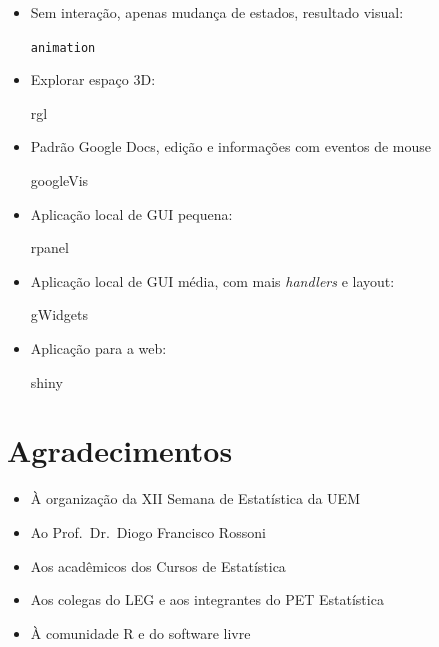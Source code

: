 \begin{frame}

  \begin{multicols}{2}
    \begin{itemize}
      \pause \item Sem interação, apenas mudança de estados, resultado
      visual: \pause
      \begin{center}
        \texttt{animation}
      \end{center}
      \pause \item Explorar espaço 3D: \pause
      \begin{center}
        rgl
      \end{center}
      \pause \item Padrão Google Docs, edição e informações com eventos
      de mouse \pause
      \begin{center}
        googleVis
      \end{center}
      \vfill \columnbreak \pause \item Aplicação local de GUI pequena:
      \pause
      \begin{center}
        rpanel
      \end{center}
      \pause \item Aplicação local de GUI média, com mais
      \textit{handlers} e layout: \pause
      \begin{center}
        gWidgets
      \end{center}
      \pause \item Aplicação para a web: \pause
      \begin{center}
        shiny
      \end{center}
    \end{itemize}
  \end{multicols}

\end{frame}

\section{Agradecimentos}

\begin{frame}

  \begin{itemize}
  \item À organização da XII Semana de Estatística da UEM
  \item Ao Prof.~Dr.~Diogo Francisco Rossoni
  \item Aos acadêmicos dos Cursos de Estatística
  \item Aos colegas do LEG e aos integrantes do PET Estatística
  \item À comunidade R e do software livre
  \end{itemize}

\end{frame}

